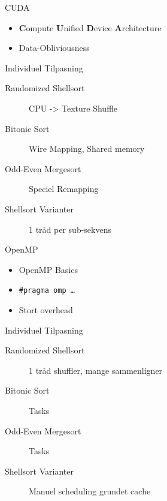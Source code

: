 \begin{frame}{CUDA}
	\begin{itemize}
		\item \textbf{C}ompute \textbf{U}nified \textbf{D}evice \textbf{A}rchitecture
		\item Data-Obliviousness
	\end{itemize}
	\begin{block}{Individuel Tilpasning}
		\begin{description}
			\item[Randomized Shellsort] CPU -> Texture Shuffle
			\item[Bitonic Sort] Wire Mapping, Shared memory
			\item[Odd-Even Mergesort] Speciel Remapping
			\item[Shellsort Varianter] 1 tråd per sub-sekvens
		\end{description}
	\end{block}
\end{frame}

\begin{frame}{OpenMP}
	\begin{itemize}
		\item OpenMP Basics
		\item \texttt{\#pragma omp \dots}
		\item Stort overhead
	\end{itemize}
	\begin{block}{Individuel Tilpasning}
		\begin{description}
			\item[Randomized Shellsort] 1 tråd shuffler, mange sammenligner
			\item[Bitonic Sort] Tasks
			\item[Odd-Even Mergesort] Tasks
			\item[Shellsort Varianter] Manuel scheduling grundet cache
		\end{description}
	\end{block}
\end{frame}
